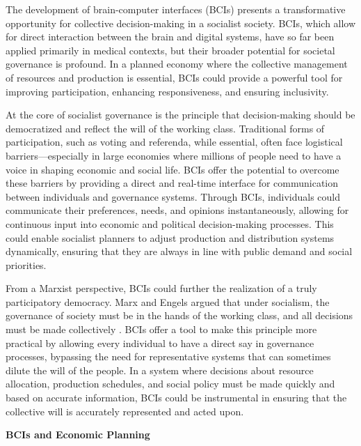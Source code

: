 \begin{refsection}
The development of brain-computer interfaces (BCIs) presents a transformative opportunity for collective decision-making in a socialist society. BCIs, which allow for direct interaction between the brain and digital systems, have so far been applied primarily in medical contexts, but their broader potential for societal governance is profound. In a planned economy where the collective management of resources and production is essential, BCIs could provide a powerful tool for improving participation, enhancing responsiveness, and ensuring inclusivity.

At the core of socialist governance is the principle that decision-making should be democratized and reflect the will of the working class. Traditional forms of participation, such as voting and referenda, while essential, often face logistical barriers—especially in large economies where millions of people need to have a voice in shaping economic and social life. BCIs offer the potential to overcome these barriers by providing a direct and real-time interface for communication between individuals and governance systems. Through BCIs, individuals could communicate their preferences, needs, and opinions instantaneously, allowing for continuous input into economic and political decision-making processes. This could enable socialist planners to adjust production and distribution systems dynamically, ensuring that they are always in line with public demand and social priorities.

From a Marxist perspective, BCIs could further the realization of a truly participatory democracy. Marx and Engels argued that under socialism, the governance of society must be in the hands of the working class, and all decisions must be made collectively \cite[pp.~61-64]{marx_manifesto_1959}. BCIs offer a tool to make this principle more practical by allowing every individual to have a direct say in governance processes, bypassing the need for representative systems that can sometimes dilute the will of the people. In a system where decisions about resource allocation, production schedules, and social policy must be made quickly and based on accurate information, BCIs could be instrumental in ensuring that the collective will is accurately represented and acted upon.

\textbf{BCIs and Economic Planning}


\end{refsection}
